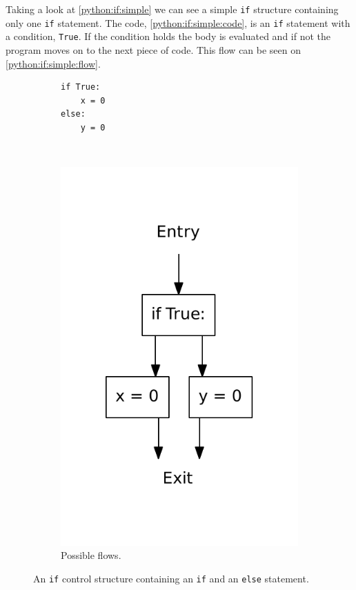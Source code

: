 Taking a look at \cref{python:if:simple} we can see a simple \texttt{if} structure containing only one \texttt{if} statement.
The code, \cref{python:if:simple:code}, is an \texttt{if} statement with a condition, \texttt{True}.
If the condition holds the body is evaluated and if not the program moves on to the next piece of code.
This flow can be seen on \cref{python:if:simple:flow}.


\begin{figure}
  \centering
  \begin{subfigure}[b]{0.4\textwidth}
    \begin{lstlisting}[style=python, caption={Code example.}, label={python:if:else:code}]
if True:
    x = 0
else:
    y = 0
    \end{lstlisting}
  \end{subfigure}
  ~ %
  \begin{subfigure}[b]{0.4\textwidth}
    \centering
    \includegraphics[scale=.5]{./figures/if_else.pdf}
    \caption{Possible flows.}
    \label{python:if:else:flow}
  \end{subfigure}
  \caption{An \texttt{if} control structure containing an \texttt{if} and an \texttt{else} statement.}
  \label{python:if:else}
\end{figure}

